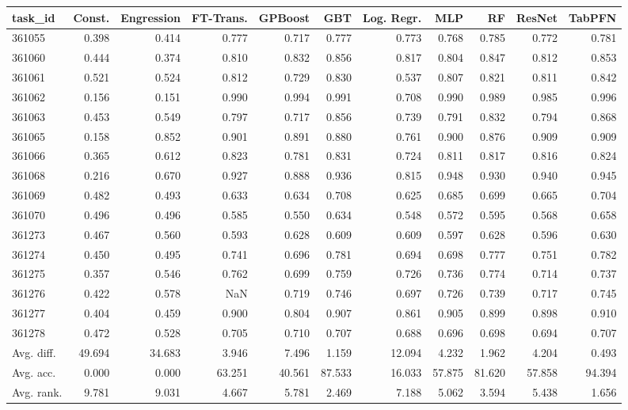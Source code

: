 \begin{tabular}{lrrrrrrrrrr}
\toprule
task\_id & Const. & Engression & FT-Trans. & GPBoost & GBT & Log. Regr. & MLP & RF & ResNet & TabPFN \\
\midrule
361055 & 0.398 & 0.414 & 0.777 & 0.717 & 0.777 & 0.773 & 0.768 & 0.785 & 0.772 & 0.781 \\
361060 & 0.444 & 0.374 & 0.810 & 0.832 & 0.856 & 0.817 & 0.804 & 0.847 & 0.812 & 0.853 \\
361061 & 0.521 & 0.524 & 0.812 & 0.729 & 0.830 & 0.537 & 0.807 & 0.821 & 0.811 & 0.842 \\
361062 & 0.156 & 0.151 & 0.990 & 0.994 & 0.991 & 0.708 & 0.990 & 0.989 & 0.985 & 0.996 \\
361063 & 0.453 & 0.549 & 0.797 & 0.717 & 0.856 & 0.739 & 0.791 & 0.832 & 0.794 & 0.868 \\
361065 & 0.158 & 0.852 & 0.901 & 0.891 & 0.880 & 0.761 & 0.900 & 0.876 & 0.909 & 0.909 \\
361066 & 0.365 & 0.612 & 0.823 & 0.781 & 0.831 & 0.724 & 0.811 & 0.817 & 0.816 & 0.824 \\
361068 & 0.216 & 0.670 & 0.927 & 0.888 & 0.936 & 0.815 & 0.948 & 0.930 & 0.940 & 0.945 \\
361069 & 0.482 & 0.493 & 0.633 & 0.634 & 0.708 & 0.625 & 0.685 & 0.699 & 0.665 & 0.704 \\
361070 & 0.496 & 0.496 & 0.585 & 0.550 & 0.634 & 0.548 & 0.572 & 0.595 & 0.568 & 0.658 \\
361273 & 0.467 & 0.560 & 0.593 & 0.628 & 0.609 & 0.609 & 0.597 & 0.628 & 0.596 & 0.630 \\
361274 & 0.450 & 0.495 & 0.741 & 0.696 & 0.781 & 0.694 & 0.698 & 0.777 & 0.751 & 0.782 \\
361275 & 0.357 & 0.546 & 0.762 & 0.699 & 0.759 & 0.726 & 0.736 & 0.774 & 0.714 & 0.737 \\
361276 & 0.422 & 0.578 & NaN & 0.719 & 0.746 & 0.697 & 0.726 & 0.739 & 0.717 & 0.745 \\
361277 & 0.404 & 0.459 & 0.900 & 0.804 & 0.907 & 0.861 & 0.905 & 0.899 & 0.898 & 0.910 \\
361278 & 0.472 & 0.528 & 0.705 & 0.710 & 0.707 & 0.688 & 0.696 & 0.698 & 0.694 & 0.707 \\
Avg. diff. & 49.694 & 34.683 & 3.946 & 7.496 & 1.159 & 12.094 & 4.232 & 1.962 & 4.204 & 0.493 \\
Avg. acc. & 0.000 & 0.000 & 63.251 & 40.561 & 87.533 & 16.033 & 57.875 & 81.620 & 57.858 & 94.394 \\
Avg. rank. & 9.781 & 9.031 & 4.667 & 5.781 & 2.469 & 7.188 & 5.062 & 3.594 & 5.438 & 1.656 \\
\bottomrule
\end{tabular}
